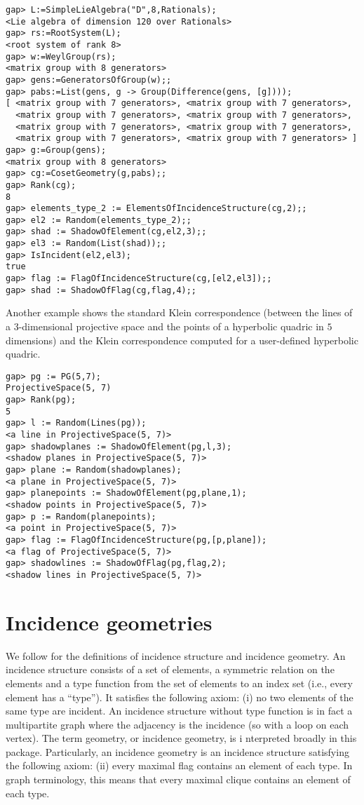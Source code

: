 \documentclass{article}
\begin{document}
\begin{verbatim}
gap> L:=SimpleLieAlgebra("D",8,Rationals);
<Lie algebra of dimension 120 over Rationals>
gap> rs:=RootSystem(L);
<root system of rank 8>
gap> w:=WeylGroup(rs);
<matrix group with 8 generators>
gap> gens:=GeneratorsOfGroup(w);;
gap> pabs:=List(gens, g -> Group(Difference(gens, [g])));
[ <matrix group with 7 generators>, <matrix group with 7 generators>, 
  <matrix group with 7 generators>, <matrix group with 7 generators>, 
  <matrix group with 7 generators>, <matrix group with 7 generators>, 
  <matrix group with 7 generators>, <matrix group with 7 generators> ]
gap> g:=Group(gens);
<matrix group with 8 generators>
gap> cg:=CosetGeometry(g,pabs);;
gap> Rank(cg);
8
gap> elements_type_2 := ElementsOfIncidenceStructure(cg,2);;
gap> el2 := Random(elements_type_2);;
gap> shad := ShadowOfElement(cg,el2,3);;
gap> el3 := Random(List(shad));;
gap> IsIncident(el2,el3);
true
gap> flag := FlagOfIncidenceStructure(cg,[el2,el3]);;
gap> shad := ShadowOfFlag(cg,flag,4);;
\end{verbatim}

Another example shows the standard Klein correspondence (between the lines of a $3$-dimensional projective space and the points of a hyperbolic quadric in $5$ dimensions) and the Klein correspondence computed for a user-defined hyperbolic quadric.

\begin{verbatim}
gap> pg := PG(5,7);
ProjectiveSpace(5, 7)
gap> Rank(pg);
5
gap> l := Random(Lines(pg));
<a line in ProjectiveSpace(5, 7)>
gap> shadowplanes := ShadowOfElement(pg,l,3);
<shadow planes in ProjectiveSpace(5, 7)>
gap> plane := Random(shadowplanes);
<a plane in ProjectiveSpace(5, 7)>
gap> planepoints := ShadowOfElement(pg,plane,1);
<shadow points in ProjectiveSpace(5, 7)>
gap> p := Random(planepoints);
<a point in ProjectiveSpace(5, 7)>
gap> flag := FlagOfIncidenceStructure(pg,[p,plane]);
<a flag of ProjectiveSpace(5, 7)>
gap> shadowlines := ShadowOfFlag(pg,flag,2);
<shadow lines in ProjectiveSpace(5, 7)>
\end{verbatim}

\section{Incidence geometries}

We follow \cite{BC13} for the definitions of incidence structure and incidence geometry. An incidence structure 
consists of a set of elements, a symmetric relation on the elements and a type function from the set of 
elements to an index set (i.e., every element has a ``type''). It satisfies the following axiom: (i) no two elements 
of the same type are incident. An incidence structure without type function is in fact a multipartite graph where 
the adjacency is the incidence (so with a loop on each vertex). The term geometry, or incidence geometry, is i
nterpreted broadly in this package. Particularly, an incidence geometry is an incidence structure satisfying the 
following axiom: (ii) every maximal flag contains an element of each type. In graph terminology, this means that 
every maximal clique contains an element of each type.
\end{document}
